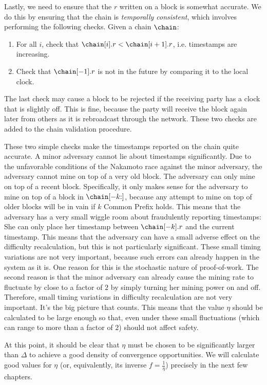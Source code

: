 Lastly, we need to ensure that the $r$ written on a block is somewhat
accurate. We do this by ensuring that the chain is \emph{temporally consistent},
which involves performing the following checks. Given a chain $\chain$:

\begin{enumerate}
  \item For all $i$, check that $\chain[i].r < \chain[i + 1].r$, i.e. timestamps are increasing.
  \item Check that $\chain[-1].r$ is not in the future by comparing it to the local clock.
\end{enumerate}

The last check may cause a block to be rejected if the receiving party
has a clock that is slightly off. This is fine, because the party will
receive the block again later from others as it is rebroadcast through
the network. These two checks are added to the chain validation procedure.

These two simple checks make the timestamps reported on the chain quite
accurate. A minor adversary cannot lie about timestamps significantly.
Due to the unfavorable conditions of the Nakamoto race against the minor
adversary, the adversary cannot mine on top of a very old block. The
adversary can only mine on top of a recent block. Specifically, it only
makes sense for the adversary to mine on top of a block in
$\chain[{-k}{:}]$, because any attempt to mine on top of older blocks
will be in vain if $k$ Common Prefix holds. This means that the adversary
has a very small wiggle room about fraudulently reporting timestamps:
She can only place her timestamp between $\chain[{-k}].r$ and the current
timestamp. This means that the adversary can have a small adverse effect
on the difficulty recalculation, but this is not particularly significant.
These small timing variations are not very important, because such errors
can already happen in the system as it is. One reason for this is the
stochastic nature of proof-of-work.
The second reason is that the minor adversary can already cause the mining rate to fluctuate
by close to a factor of $2$ by simply turning her mining power on and off.
Therefore, small timing variations in difficulty recalculation are not very important.
It's the big picture that counts. This means that the value $\eta$ should be
calculated to be large enough so that, even under these small fluctuations
(which can range to more than a factor of $2$) should not affect safety.

At this point, it should be clear that $\eta$ must be chosen to be significantly
larger than $\Delta$ to achieve a good density of convergence opportunities.
We will calculate good values for $\eta$ (or, equivalently, its inverse $f = \frac{1}{\eta}$)
precisely in the next few chapters.

